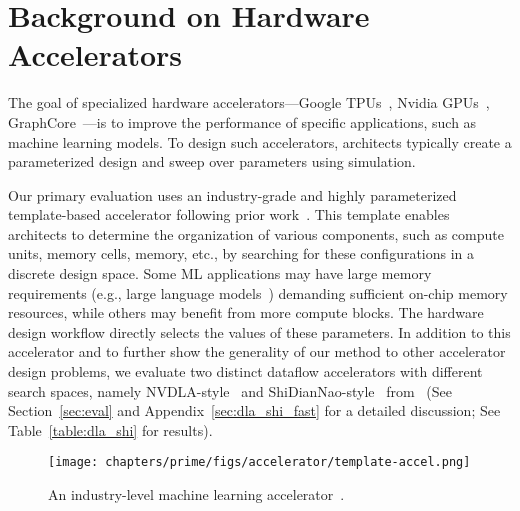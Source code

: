 \vspace{-0.2cm}
\section{Background on Hardware Accelerators}
\vspace{-0.2cm}
\label{sec:accelerator_background}
The goal of specialized hardware accelerators---Google TPUs~\citep{jouppi2017datacenter,edgetpu:arxiv:2020}, Nvidia GPUs~\citep{nvidia}, GraphCore~\citep{graphcore}---is to improve the performance of specific applications, such as machine learning models. To design such accelerators, architects typically create a parameterized design and sweep over parameters using simulation.

%
Our primary evaluation uses an industry-grade and highly parameterized template-based accelerator following prior work~\citep{yazdanbakhsh2021evaluation}.
%
This template enables architects to determine the organization of various components, such as compute units, memory cells, memory, etc., by searching for these configurations in a discrete design space. Some ML applications may have large memory requirements (e.g., large language models~\citep{brown2020language}) demanding sufficient on-chip memory resources, while others may benefit from more compute blocks. The hardware design workflow directly selects the values of these parameters.
%
In addition to this accelerator and to further show the generality of our method to other accelerator design problems, we evaluate two distinct dataflow accelerators with different search spaces, namely NVDLA-style~\citep{nvdla} and ShiDianNao-style~\citep{shidiannao} from~\citet{kao2020confuciux} (See Section~\ref{sec:eval} and Appendix~\ref{sec:dla_shi_fast} for a detailed discussion; See Table~\ref{table:dla_shi} for results).

\begin{wrapfigure}{r}{0.47\textwidth}
    \centering
    \vspace{-0.1in}
    \texttt{[image: chapters/prime/figs/accelerator/template-accel.png]}
    \vspace{-0.1cm}
    \caption{An industry-level machine learning accelerator~\cite{yazdanbakhsh2021evaluation}.}
    \label{fig:template_accel}
    \vspace{-0.5cm}
    \label{fig:accels}
\end{wrapfigure} 


